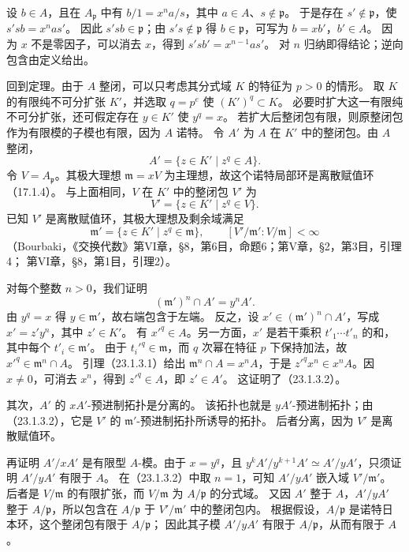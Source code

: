 \eproof
设 $b\in A$，且在 $A_{\mathfrak p}$ 中有 $b/1=x^na/s$，其中 $a\in A$、$s\notin\mathfrak p$。
于是存在 $s'\notin\mathfrak p$，使 $s'sb=x^nas'$。
因此 $s'sb\in\mathfrak p$；由 $s's\notin\mathfrak p$ 得 $b\in\mathfrak p$，可写为 $b=xb'$，$b'\in A$。
因为 $x$ 不是零因子，可以消去 $x$，得到 $s'sb'=x^{n-1}as'$。
对 $n$ 归纳即得结论；逆向包含由定义给出。
\finishproof

\eproof
回到定理。由于 $A$ 整闭，可以只考虑其分式域 $K$ 的特征为 $p>0$ 的情形。
取 $K$ 的有限纯不可分扩张 $K'$，并选取 $q=p^e$ 使 $(K')^q\subset K$。
必要时扩大这一有限纯不可分扩张，还可假定存在 $y\in K'$ 使 $y^q=x$。
若扩大后整闭包有限，则原整闭包作为有限模的子模也有限，因为 $A$ 诺特。
令 $A'$ 为 $A$ 在 $K'$ 中的整闭包。由 $A$ 整闭，
\[
 A'=\{z\in K'\mid z^q\in A\}.
\]
令 $V=A_{\mathfrak p}$。其极大理想 $\mathfrak m=xV$ 为主理想，故这个诺特局部环是离散赋值环（17.1.4）。
与上面相同，$V$ 在 $K'$ 中的整闭包 $V'$ 为
\[
 V'=\{z\in K'\mid z^q\in V\}.
\]
已知 $V'$ 是离散赋值环，其极大理想及剩余域满足
\[
 \mathfrak m'=\{z\in K'\mid z^q\in\mathfrak m\},
 \qquad [V'/\mathfrak m':V/\mathfrak m]<\infty
\]
（Bourbaki，《交换代数》第VI章，\S8，第6目，命题6；第V章，\S2，第3目，引理4；
第VI章，\S8，第1目，引理2）。

对每个整数 $n>0$，我们证明
\begin{equation}
 (\mathfrak m')^n\cap A'=y^nA'.\tag{23.1.3.2}
\end{equation}
由 $y^q=x$ 得 $y\in\mathfrak m'$，故右端包含于左端。
反之，设 $x'\in(\mathfrak m')^n\cap A'$，写成 $x'=z'y^n$，其中 $z'\in K'$。
有 $x'^q\in A$。另一方面，$x'$ 是若干乘积 $t'_1\cdots t'_n$ 的和，其中每个 $t'_i\in\mathfrak m'$。
由于 $t_i'^q\in\mathfrak m$，而 $q$ 次幂在特征 $p$ 下保持加法，故
$x'^q\in\mathfrak m^n\cap A$。
引理（23.1.3.1）给出 $\mathfrak m^n\cap A=x^nA$，于是
$z'^qx^n\in x^nA$。因 $x\ne0$，可消去 $x^n$，得到 $z'^q\in A$，即 $z'\in A'$。
这证明了（23.1.3.2）。

其次，$A'$ 的 $xA'$-预进制拓扑是分离的。
该拓扑也就是 $yA'$-预进制拓扑；由（23.1.3.2），它是 $V'$ 的 $\mathfrak m'$-预进制拓扑所诱导的拓扑。
后者分离，因为 $V'$ 是离散赋值环。

再证明 $A'/xA'$ 是有限型 $A$-模。由于 $x=y^q$，且
$y^kA'/y^{k+1}A'\simeq A'/yA'$，只须证明 $A'/yA'$ 有限于 $A$。
在（23.1.3.2）中取 $n=1$，可知 $A'/yA'$ 嵌入域 $V'/\mathfrak m'$。
后者是 $V/\mathfrak m$ 的有限扩张，而 $V/\mathfrak m$ 为 $A/\mathfrak p$ 的分式域。
又因 $A'$ 整于 $A$，$A'/yA'$ 整于 $A/\mathfrak p$，所以包含在
$A/\mathfrak p$ 于 $V'/\mathfrak m'$ 中的整闭包内。
根据假设，$A/\mathfrak p$ 是诺特日本环，这个整闭包有限于 $A/\mathfrak p$；
因此其子模 $A'/yA'$ 有限于 $A/\mathfrak p$，从而有限于 $A$。

